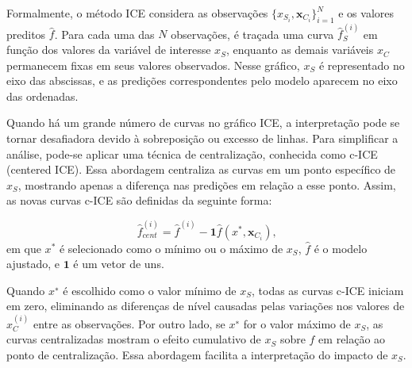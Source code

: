 \documentclass[
  12pt,
  a4paper,
]{scrreprt}
\begin{document}
Formalmente, o método ICE considera as observações
\(\{x_{S_i}, \mathbf{x}_{C_i}\}_{i=1}^{N}\)\hspace{0pt} e os valores
preditos \(\hat f\)\hspace{0pt}. Para cada uma das \(N\) observações, é
traçada uma curva \(\hat f_S^{\left(i\right)}\)\hspace{0pt} em função
dos valores da variável de interesse \(x_S\)\hspace{0pt}, enquanto as
demais variáveis \(x_C\)\hspace{0pt} permanecem fixas em seus valores
observados. Nesse gráfico, \(x_S\)\hspace{0pt} é representado no eixo
das abscissas, e as predições correspondentes pelo modelo aparecem no
eixo das ordenadas.

\vspace{12pt}

Quando há um grande número de curvas no gráfico ICE, a interpretação
pode se tornar desafiadora devido à sobreposição ou excesso de linhas.
Para simplificar a análise, pode-se aplicar uma técnica de
centralização, conhecida como c-ICE (centered ICE). Essa abordagem
centraliza as curvas em um ponto específico de \(x_S\)\hspace{0pt},
mostrando apenas a diferença nas predições em relação a esse ponto.
Assim, as novas curvas c-ICE são definidas da seguinte forma:

\[
\hat{f}_{cent}^{\left(i\right)} = \hat{f}^{\left(i\right)} - \mathbf{1} \hat{f}\left(x^*, \mathbf x_{C_i}\right)\text{,}
\] em que \(x^*\) é selecionado como o mínimo ou o máximo de
\(x_S\)\hspace{0pt}, \(\hat f\)\hspace{0pt} é o modelo ajustado, e
\(\mathbf 1\) é um vetor de uns.

\vspace{12pt}

Quando \(x^∗\) é escolhido como o valor mínimo de \(x_S\), todas as
curvas c-ICE iniciam em zero, eliminando as diferenças de nível causadas
pelas variações nos valores de \(x_C^{\left(i\right)}\)\hspace{0pt}
entre as observações. Por outro lado, se \(x^∗\) for o valor máximo de
\(x_S\), as curvas centralizadas mostram o efeito cumulativo de
\(x_S\)\hspace{0pt} sobre \(\hat f\)\hspace{0pt} em relação ao ponto de
centralização. Essa abordagem facilita a interpretação do impacto de
\(x_S\).
\end{document}
